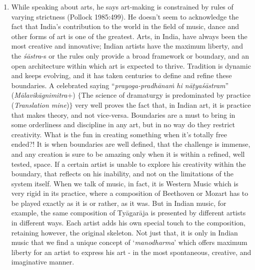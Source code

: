 \begin{enumerate}
\item While speaking about arts, he says art-making is constrained by rules of varying strictness (Pollock 1985:499). He doesn't seem to acknowledge the fact that India's contribution to the world in the field of music, dance and other forms of art is one of the greatest. Arts, in India, have always been the most creative and innovative; Indian artists have the maximum liberty, and the {\sl śāstra}-s or the rules only provide a broad framework or boundary, and an open architecture within which art is expected to thrive. Tradition is dynamic and keeps evolving, and it has taken centuries to define and refine these boundaries. A celebrated saying ``{\sl prayoga-pradhānaṁ hi nāṭyaśāstram}'' ({\sl Mālavikāgnimitra}+) $\{$The science of dramaturgy is predominated by practice ({\sl Translation mine})$\}$ very well proves the fact that, in Indian art, it is practice that makes theory, and not vice-versa. Boundaries are a must to bring in some orderliness and discipline in any art, but in no way do they restrict creativity. What is the fun in creating something when it's totally free ended?! It is when boundaries are well defined, that the challenge is immense, and any creation is sure to be amazing only when it is within a refined, well tested, space. If a certain artist is unable to explore his creativity within the boundary, that reflects on his inability, and not on the limitations of the system itself. When we talk of music, in fact, it is Western Music which is very rigid in its practice, where a composition of Beethoven or Mozart has to be played exactly as it is or rather, as it was. But in Indian music, for example, the same composition of Tyāgarāja is presented by different artists in different ways. Each artist adds his own special touch to the composition, retaining however, the original skeleton. Not just that, it is only in Indian music that we find a unique concept of `{\sl manodharma}' which offers maximum liberty for an artist to express his art - in the most spontaneous, creative, and imaginative manner. 


\end{enumerate}

